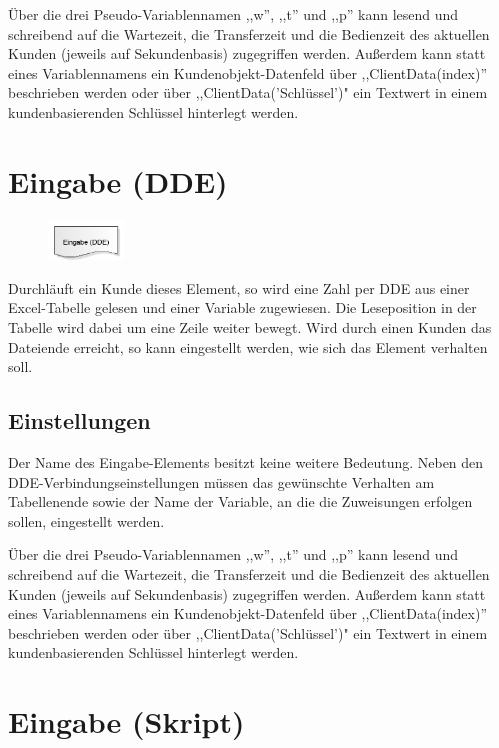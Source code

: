 Über die drei Pseudo-Variablennamen ,,w'', ,,t'' und ,,p'' kann lesend und schreibend auf die Wartezeit, die Transferzeit
und die Bedienzeit des aktuellen Kunden (jeweils auf Sekundenbasis) zugegriffen werden. Außerdem kann statt eines
Variablennamens ein Kundenobjekt-Datenfeld über ,,ClientData(index)'' beschrieben werden oder über ,,ClientData('Schlüssel')"
ein Textwert in einem kundenbasierenden Schlüssel hinterlegt werden.


\section{Eingabe (DDE)}
\label{ref:ModelElementInputDDE}

\begin{figure}
\vspace{-22pt}
\includegraphics[width=2cm]{imageModelElementInputDDE.png}
\vspace{-22pt}
\end{figure}

Durchläuft ein Kunde dieses Element, so wird eine Zahl per DDE aus einer Excel-Tabelle gelesen und einer
Variable zugewiesen. Die Leseposition in der Tabelle wird dabei um eine Zeile weiter bewegt.
Wird durch einen Kunden das Dateiende erreicht, so kann eingestellt werden, wie sich
das Element verhalten soll.

\subsection*{Einstellungen}

Der Name des Eingabe-Elements besitzt keine weitere Bedeutung. Neben den DDE-Verbindungseinstellungen
müssen das gewünschte Verhalten am Tabellenende
sowie der Name der Variable, an die die Zuweisungen erfolgen sollen, eingestellt werden.

Über die drei Pseudo-Variablennamen ,,w'', ,,t'' und ,,p'' kann lesend und schreibend auf die Wartezeit, die Transferzeit
und die Bedienzeit des aktuellen Kunden (jeweils auf Sekundenbasis) zugegriffen werden. Außerdem kann statt eines
Variablennamens ein Kundenobjekt-Datenfeld über ,,ClientData(index)'' beschrieben werden oder über ,,ClientData('Schlüssel')"
ein Textwert in einem kundenbasierenden Schlüssel hinterlegt werden.


\section{Eingabe (Skript)}
\label{ref:ModelElementInputJS}

